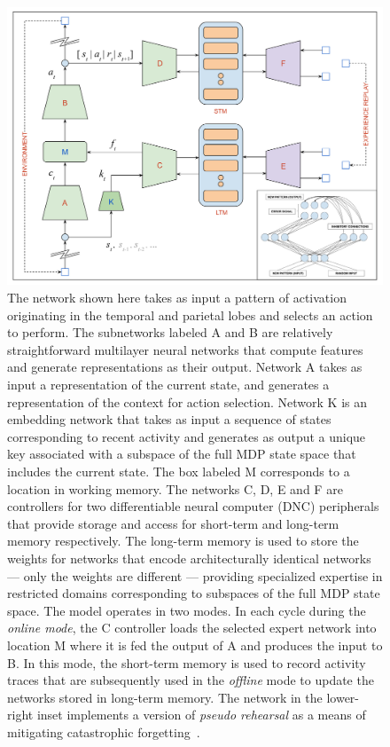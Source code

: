 \documentclass[letterpaper,11pt]{article}
\def\colorred#1{{\color{red}#1}}
\def\colorblu#1{{\color{blue}#1}}
\def\urlh#1{{}}
\def\emdash{---}
\begin{document}
\begin{figure}
%
  \begin{center} 
    \includegraphics[width=350pt]{./figures/Hippocampus_Inspired_Learning_Redux.jpg} 
  \end{center}
%
  \caption{The network shown here takes as input a pattern of activation originating in the temporal and parietal lobes and selects an action to perform. The subnetworks labeled \colorred{A} and \colorred{B} are relatively straightforward multilayer neural networks that compute features and generate representations as their output. Network \colorred{A} takes as input a representation of the current state, and generates a representation of the context for action selection. Network \colorblu{K} is an embedding network that takes as input a sequence of states corresponding to recent activity and generates as output a unique key associated with a subspace of the full MDP state space that includes the current state. The box labeled \colorblu{M} corresponds to a location in working memory. The networks \colorred{C}, \colorred{D}, \colorred{E} and \colorred{F} are controllers for two differentiable neural computer (DNC) peripherals that provide storage and access for short-term and long-term memory respectively. The long-term memory is used to store the weights for networks that encode architecturally identical networks {\emdash{}} only the weights are different {\emdash{}} providing specialized expertise in restricted domains corresponding to subspaces of the full MDP state space. The model operates in two modes. In each cycle during the {\it{online mode}}, the \colorred{C} controller loads the selected expert network into location \colorblu{M} where it is fed the output of \colorred{A} and produces the input to \colorred{B}. In this mode, the short-term memory is used to record activity traces that are subsequently used in the {\it{offline}} mode to update the networks stored in long-term memory. The network in the lower-right inset implements a version of {\it{pseudo rehearsal}} as a means of mitigating catastrophic forgetting~\cite{FrenchTiCS-99}.}
%
  \label{fig_hippo}
%
\end{figure}
\end{document}
